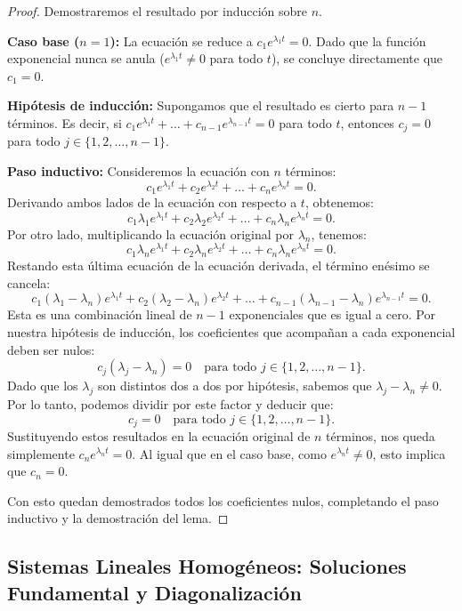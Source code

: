 \begin{proof}
    Demostraremos el resultado por inducción sobre $n$.
    
    \textbf{Caso base ($n=1$):} La ecuación se reduce a $c_1 e^{\lambda_1 t} = 0$. Dado que la función exponencial nunca se anula ($e^{\lambda_1 t} \neq 0$ para todo $t$), se concluye directamente que $c_1 = 0$.
    
    \textbf{Hipótesis de inducción:} Supongamos que el resultado es cierto para $n-1$ términos. Es decir, si $c_1 e^{\lambda_1 t} + \dots + c_{n-1} e^{\lambda_{n-1} t} = 0$ para todo $t$, entonces $c_j = 0$ para todo $j \in \{1, 2, \dots, n-1\}$.
    
    \textbf{Paso inductivo:} Consideremos la ecuación con $n$ términos:
    \[
        c_1 e^{\lambda_1 t} + c_2 e^{\lambda_2 t} + \dots + c_n e^{\lambda_n t} = 0.
    \]
    Derivando ambos lados de la ecuación con respecto a $t$, obtenemos:
    \[
        c_1 \lambda_1 e^{\lambda_1 t} + c_2 \lambda_2 e^{\lambda_2 t} + \dots + c_n \lambda_n e^{\lambda_n t} = 0.
    \]
    Por otro lado, multiplicando la ecuación original por $\lambda_n$, tenemos:
    \[
        c_1 \lambda_n e^{\lambda_1 t} + c_2 \lambda_n e^{\lambda_2 t} + \dots + c_n \lambda_n e^{\lambda_n t} = 0.
    \]
    Restando esta última ecuación de la ecuación derivada, el término enésimo se cancela:
    \[
        c_1 (\lambda_1 - \lambda_n) e^{\lambda_1 t} + c_2 (\lambda_2 - \lambda_n) e^{\lambda_2 t} + \dots + c_{n-1} (\lambda_{n-1} - \lambda_n) e^{\lambda_{n-1} t} = 0.
    \]
    Esta es una combinación lineal de $n-1$ exponenciales que es igual a cero. Por nuestra hipótesis de inducción, los coeficientes que acompañan a cada exponencial deben ser nulos:
    \[
        c_j (\lambda_j - \lambda_n) = 0 \quad \text{para todo } j \in \{1, 2, \dots, n-1\}.
    \]
    Dado que los $\lambda_j$ son distintos dos a dos por hipótesis, sabemos que $\lambda_j - \lambda_n \neq 0$. Por lo tanto, podemos dividir por este factor y deducir que:
    \[
        c_j = 0 \quad \text{para todo } j \in \{1, 2, \dots, n-1\}.
    \]
    Sustituyendo estos resultados en la ecuación original de $n$ términos, nos queda simplemente $c_n e^{\lambda_n t} = 0$. Al igual que en el caso base, como $e^{\lambda_n t} \neq 0$, esto implica que $c_n = 0$. 
    
    Con esto quedan demostrados todos los coeficientes nulos, completando el paso inductivo y la demostración del lema.
\end{proof}

\subsection*{Sistemas Lineales Homogéneos: Soluciones Fundamental y Diagonalización}

